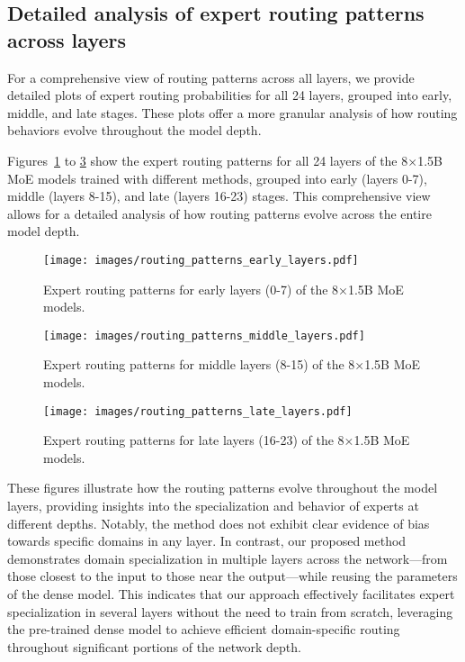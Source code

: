 \subsection{Detailed analysis of expert routing patterns across layers}\label{subsec:detailed_routing_analysis}

For a comprehensive view of routing patterns across all layers, we provide detailed plots of expert routing probabilities for all 24 layers, grouped into early, middle, and late stages. These plots offer a more granular analysis of how routing behaviors evolve throughout the model depth.

Figures~\ref{fig:routing_early} to \ref{fig:routing_late} show the expert routing patterns for all 24 layers of the 8×1.5B MoE models trained with different methods, grouped into early (layers 0-7), middle (layers 8-15), and late (layers 16-23) stages. This comprehensive view allows for a detailed analysis of how routing patterns evolve across the entire model depth.

\begin{figure}[t]
\centering
\texttt{[image: images/routing\_patterns\_early\_layers.pdf]}
\caption{Expert routing patterns for early layers (0-7) of the 8×1.5B MoE models.}
\label{fig:routing_early}
\end{figure}

\begin{figure}[t]
\centering
\texttt{[image: images/routing\_patterns\_middle\_layers.pdf]}
\caption{Expert routing patterns for middle layers (8-15) of the 8×1.5B MoE models.}
\label{fig:routing_middle}
\end{figure}

\begin{figure}[t]
\centering
\texttt{[image: images/routing\_patterns\_late\_layers.pdf]}
\caption{Expert routing patterns for late layers (16-23) of the 8×1.5B MoE models.}
\label{fig:routing_late}
\end{figure}

These figures illustrate how the routing patterns evolve throughout the model layers, providing insights into the specialization and behavior of experts at different depths. Notably, the \NUname {} method does not exhibit clear evidence of bias towards specific domains in any layer. In contrast, our proposed method demonstrates domain specialization in multiple layers across the network—from those closest to the input to those near the output—while reusing the parameters of the dense model. This indicates that our approach effectively facilitates expert specialization in several layers without the need to train from scratch, leveraging the pre-trained dense model to achieve efficient domain-specific routing throughout significant portions of the network depth.


